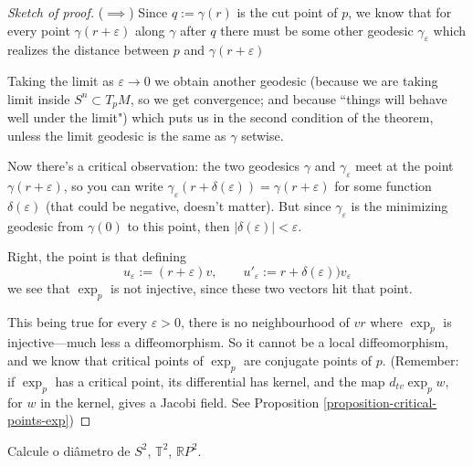 \begin{proof}[Sketch of proof]
($\implies$) Since $q:=\gamma(r)$ is the cut point of $p$, we know that for every point
$\gamma(r+\varepsilon)$ along $\gamma$ after $q$ there must be some other geodesic
$\gamma_\varepsilon$ which realizes the distance between $p$ and
$\gamma(r+\varepsilon)$

Taking the limit as $\varepsilon \to 0$ we obtain another geodesic
(because we are taking limit inside $S^n \subset T_pM$, so we get convergence;
and because ``things will behave well under the limit")
which puts us in the second condition of the theorem,
unless the limit geodesic is the same as  $\gamma$ setwise.

Now there's a critical observation:
the two geodesics $\gamma$ and $\gamma_\varepsilon$ meet at the point 
 $\gamma(r+\varepsilon)$, so you can write
 $\gamma_\varepsilon(r+\delta(\varepsilon))=\gamma(r+\varepsilon)$
 for some function $\delta(\varepsilon)$ (that could be negative, doesn't
 matter).
 But since $\gamma_\varepsilon$ is the minimizing
 geodesic from $\gamma(0)$ to this point, then
 $|\delta(\varepsilon)|<\varepsilon$.

Right, the point is that defining
$$
u_\varepsilon:=(r+\varepsilon)v,\qquad
u'_\varepsilon:=r+\delta(\varepsilon))v_\varepsilon
$$
we see that $\operatorname{exp}_p$ is not injective, since these two vectors
hit that point.

This being true for every $\varepsilon>0$, there is no neighbourhood of $vr$ 
where $\operatorname{exp}_p$ is injective---much less a diffeomorphism.
So it cannot be a local diffeomorphism, and we know that critical points of
$\operatorname{exp}_p$ are conjugate points of $p$. (Remember: if
$\operatorname{exp}_p$ has a critical point, its differential has kernel,
and the map $d_{tv}\operatorname{exp}_pw$, for $w$ in the kernel, gives 
a Jacobi field. See Proposition \ref{proposition-critical-points-exp})
\end{proof}

\begin{exercise}[Diâmetros]
\label{exercise-diametros}
Calcule o diâmetro de $S^2$, $\mathbb{T}^2$, $\mathbb{R}P^{2}$.
\end{exercise}

